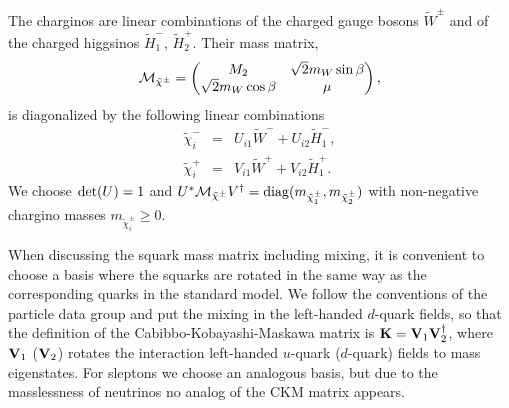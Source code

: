 The charginos are linear combinations of the charged gauge bosons ${\tilde
  W^\pm}$ and of the charged higgsinos ${\tilde H_1^-}$, ${\tilde H_2^+}$.
Their mass matrix,
\begin{eqnarray}
  {\cal M}_{\tilde{\chi}^\pm} = 
  \left( \begin{matrix} %
  {M_2} & \sqrt{2} m_W \sin\beta \cr 
  \sqrt{2} m_W \cos\beta & \mu 
  \end{matrix} %
  \right) ,
\end{eqnarray}
is diagonalized by the following linear combinations
\begin{eqnarray}
  \tilde{\chi}^-_i & = & U_{i1} \tilde{W}^- + U_{i2} \tilde{H}_1^- , \\
  \tilde{\chi}^+_i & = & V_{i1} \tilde{W}^+ + V_{i2} \tilde{H}_1^+ .
\end{eqnarray}
We choose ${\rm det}(U)=1$ and $U^* {\cal M}_{\tilde{\chi}^\pm}
V^\dagger = {\rm diag} ( m_{\tilde{\chi}^\pm_1},
m_{\tilde{\chi}^\pm_2} )$ with non-negative chargino masses $
m_{\tilde{\chi}^\pm_i} \ge 0$.

When discussing the squark mass matrix including mixing, it is
convenient to choose a basis where the squarks are rotated in the same
way as the corresponding quarks in the standard model.  We follow the
conventions of the particle data group \cite{Olive:2016xmw} and put the mixing
in the left-handed $d$-quark fields, so that the definition of the
Cabibbo-Kobayashi-Maskawa matrix is $\mbox{\bf K}= \mbox{\bf V}_1
\mbox{\bf V}_2^\dagger$, where $\mbox{\bf V}_1$ ($\mbox{\bf V}_2$)
rotates the interaction left-handed $u$-quark ($d$-quark) fields to
mass eigenstates.  For sleptons we choose an analogous basis, but due
to the masslessness of neutrinos no analog of the CKM matrix appears.
 
